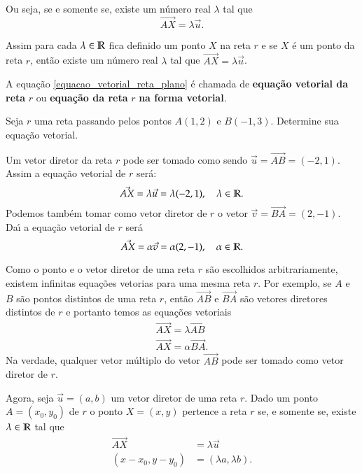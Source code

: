 Ou seja, se e somente se, existe um n\'umero real $\lambda$ tal que
\begin{equation}\label{equacao_vetorial_reta_plano}
  \vec{AX} = \lambda\vec{u}.
\end{equation}

Assim para cada $\lambda \in \mathbb{R}$ fica definido um ponto $X$ na reta $r$ e se $X$ \'e um ponto da reta $r$, ent\~ao existe um n\'umero real $\lambda$ tal que $\vec{AX} = \lambda\vec{u}$.

\begin{definicao}
  A equa\c{c}\~ao \eqref{equacao_vetorial_reta_plano} \'e chamada de \textbf{equa\c{c}\~ao vetorial da reta} $r$ ou \textbf{equa\c{c}\~ao da reta} $r$ \textbf{na forma vetorial}.
\end{definicao}

\begin{exemplos}
  Seja $r$ uma reta passando pelos pontos $A(1,2)$ e $B(-1, 3)$. Determine sua equa\c{c}\~ao vetorial.
  \begin{solucao}
    Um vetor diretor da reta $r$ pode ser tomado como sendo $\vec{u} = \vec{AB} = (-2, 1)$. Assim a equa\c{c}\~ao vetorial de $r$ ser\'a:
    \[
      \vec{AX} = \lambda\vec{u} = \lambda(-2,1), \quad \lambda \in \mathbb{R}.
    \]
    Podemos tamb\'em tomar como vetor diretor de $r$ o vetor $\vec{v} = \vec{BA} = (2,-1)$. Da{\'\i} a equa\c{c}\~ao vetorial de $r$ ser\'a
    \[
      \vec{AX} = \alpha\vec{v} = \alpha(2, -1), \quad \alpha \in \mathbb{R}.
    \]
  \end{solucao}
\end{exemplos}

\begin{observacao}
  Como o ponto e o vetor diretor de uma reta $r$ s\~ao escolhidos arbitrariamente, existem infinitas equa\c{c}\~oes vetorias para uma mesma reta $r$. Por exemplo, se $A$ e $B$ s\~ao pontos distintos de uma reta $r$, ent\~ao $\vec{AB}$ e $\vec{BA}$ s\~ao vetores diretores distintos de $r$ e portanto temos as equa\c{c}\~oes vetoriais
  \begin{align*}
    \vec{AX} = \lambda\vec{AB}\\
    \vec{AX} = \alpha\vec{BA}.
  \end{align*}
  Na verdade, qualquer vetor m\'ultiplo do vetor $\vec{AB}$ pode ser tomado como vetor diretor de $r$.
\end{observacao}

Agora, seja $\vec{u} = (a, b)$ um vetor diretor de uma reta $r$. Dado um ponto $A = (x_0, y_0)$ de $r$ o ponto $X = (x, y)$ pertence a reta $r$ se, e somente se, existe $\lambda \in \mathbb{R}$ tal que
\begin{align*}
  \vec{AX} &= \lambda\vec{u}\\
  (x - x_0, y - y_0) &= (\lambda a, \lambda b).
\end{align*}

